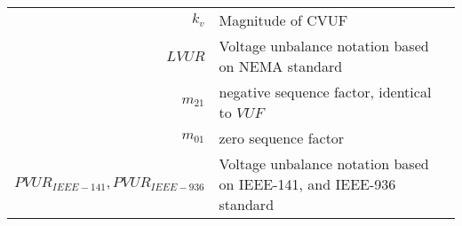 \begin{scriptsize}
\begin{tabularx}{\textwidth}{r|X}
%
$k_v$  														& Magnitude of CVUF\\
%
$LVUR$														& Voltage unbalance notation based on NEMA standard\\
%
$m_{21}$                        & negative sequence factor, identical to $VUF$\\
$m_{01}$                        & zero sequence factor\\
%
%
%
%
$PVUR_{IEEE-141},PVUR_{IEEE-936}$	& Voltage unbalance notation based on IEEE-141, and IEEE-936 standard\\
%

\end{tabularx}
\end{scriptsize}

